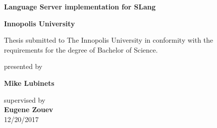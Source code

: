 \begin{titlepage}

\begin{center}

\textbf{\Large{Language Server implementation for SLang}}
\vspace{4cm}

\textbf{\Large Innopolis University} \\

\vspace{0.60cm}

{\Large Thesis submitted to The Innopolis University in conformity with the
requirements for the degree of Bachelor of Science.}

\vspace{6cm}

{\Large presented by}

\vspace{0.40cm}

\textbf{\Large Mike Lubinets}
\vspace{0.40cm}

{\Large supervised by}\\
\vspace{0.40cm}
{\bf\Large Eugene Zouev}\\
\vspace{0.60cm}
{\Large 12/20/2017}


\end{center}
\end{titlepage}
